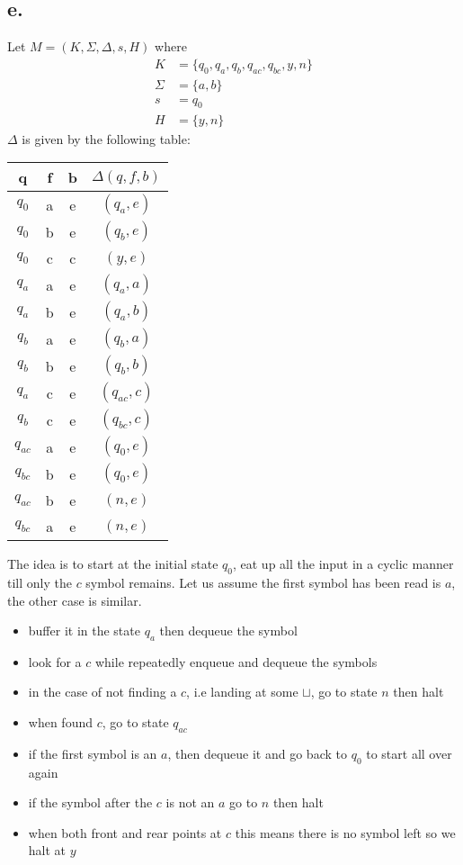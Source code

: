 \documentclass[12pt]{article}
\begin{document}
\subsection*{e.}
Let $M=(K,\Sigma, \Delta, s, H)$ where
\begin{align*}
    K &= \{q_0, q_a, q_b, q_{ac}, q_{bc}, y,n\}\\
    \Sigma &= \{a,b\}\\
    s &= q_0\\
    H &= \{y, n\}
\end{align*}
$\Delta$ is given by the following table:\\
\begin{table}[H]
    \centering
    \begin{tabular}{c|c|c|c}
     q&f&b&$\Delta(q,f,b)$  \\\hline
     $q_0$&a&e&$(q_a, e)$ \\
     $q_0$&b&e&$(q_b,e)$ \\
     $q_0$&c&c&$(y,e)$\\
     $q_a$&a&e&$(q_a,a)$\\
     $q_a$&b&e&$(q_a,b)$\\
     $q_b$&a&e&$(q_b,a)$\\
     $q_b$&b&e&$(q_b,b)$\\
     $q_a$&c&e&$(q_{ac}, c)$\\
     $q_b$&c&e&$(q_{bc}, c)$\\
     $q_{ac}$&a&e&$(q_0,e)$\\
     $q_{bc}$&b&e&$(q_0,e)$\\
     $q_{ac}$&b&e&$(n,e)$\\
     $q_{bc}$&a&e&$(n,e)$
\end{tabular}
\end{table}

The idea is to start at the initial state $q_0$, eat up all the input in a cyclic manner till only the $c$ symbol remains. Let us assume the first symbol has been read is $a$, the other case is similar.\\
\begin{itemize}
    \item buffer it in the state $q_a$ then dequeue the symbol
    \item look for a $c$ while repeatedly enqueue and dequeue the symbols
    \item in the case of not finding a $c$, i.e landing at some $\sqcup$, go to state $n$ then halt
    \item when found $c$, go to state $q_{ac}$
    \item if the first symbol is an $a$, then dequeue it and go back to $q_0$ to start all over again
    \item if the symbol after the $c$ is not an $a$ go to $n$ then halt
    \item when both front and rear points at $c$ this means there is no symbol left so we halt at $y$
\end{itemize}
\end{document}
